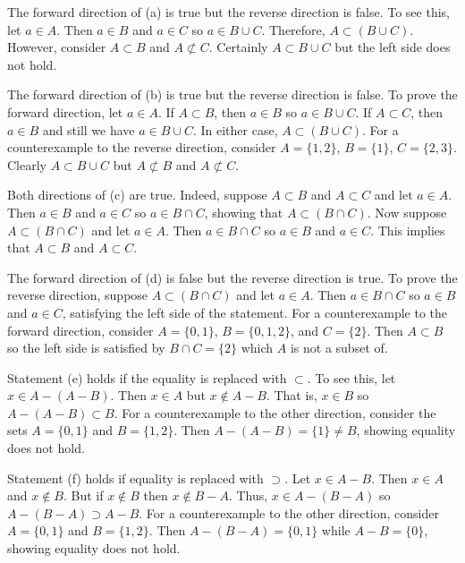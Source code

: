 \documentclass[../../master.tex]{subfiles}
\begin{document}
\begin{solution}
    The forward direction of (a) is true but the reverse direction is false.
    To see this, let $a \in A$.
    Then $a \in B$ and $a \in C$ so $a \in B \cup C$.
    Therefore, $A \subset (B \cup C)$.
    However, consider $A \subset B$ and $A \not\subset C$.
    Certainly $A \subset B \cup C$ but the left side does not hold.

    The forward direction of (b) is true but the reverse direction is false.
    To prove the forward direction, let $a \in A$.
    If $A \subset B$, then $a \in B$ so $a \in B \cup C$.
    If $A \subset C$, then $a \in B$ and still we have $a \in B \cup C$.
    In either case, $A \subset (B \cup C)$.
    For a counterexample to the reverse direction, consider $A = \{1, 2\}$, $B = \{1\}$, $C = \{2, 3\}$.
    Clearly $A \subset B \cup C$ but $A \not\subset B$ and $A \not\subset C$.

    Both directions of (c) are true.
    Indeed, suppose $A \subset B$ and $A \subset C$ and let $a \in A$.
    Then $a \in B$ and $a \in C$ so $a \in B \cap C$, showing that $A \subset (B \cap C)$.
    Now suppose $A \subset (B \cap C)$ and let $a \in A$.
    Then $a \in B \cap C$ so $a \in B$ and $a \in C$. 
    This implies that $A \subset B$ and $A \subset C$.

    The forward direction of (d) is false but the reverse direction is true.
    To prove the reverse direction, suppose $A \subset (B \cap C)$ and let $a \in A$.
    Then $a \in B \cap C$ so $a \in B$ and $a \in C$, satisfying the left side of the statement.
    For a counterexample to the forward direction, consider $A = \{0, 1\}$, $B = \{0, 1, 2\}$, and $C = \{2\}$. 
    Then $A \subset B$ so the left side is satisfied by $B \cap C = \{2\}$ which $A$ is not a subset of.

    Statement (e) holds if the equality is replaced with $\subset$.
    To see this, let $x \in A - (A - B)$. 
    Then $x \in A$ but $x \notin A - B$. 
    That is, $x \in B$ so $A - (A - B) \subset B$.
    For a counterexample to the other direction, consider the sets $A = \{0, 1\}$ and $B = \{1, 2\}$.
    Then $A - (A - B) = \{1\} \neq B$, showing equality does not hold.

    Statement (f) holds if equality is replaced with $\supset$.
    Let $x \in A - B$. 
    Then $x \in A$ and $x \notin B$. 
    But if $x \notin B$ then $x \notin B - A$.
    Thus, $x \in A - (B - A)$ so $A - (B - A) \supset A - B$.
    For a counterexample to the other direction, consider $A = \{0, 1\}$ and $B = \{1, 2\}$. 
    Then $A - (B - A) = \{0, 1\}$ while $A - B = \{0\}$, showing equality does not hold.


\end{solution}
\end{document}
